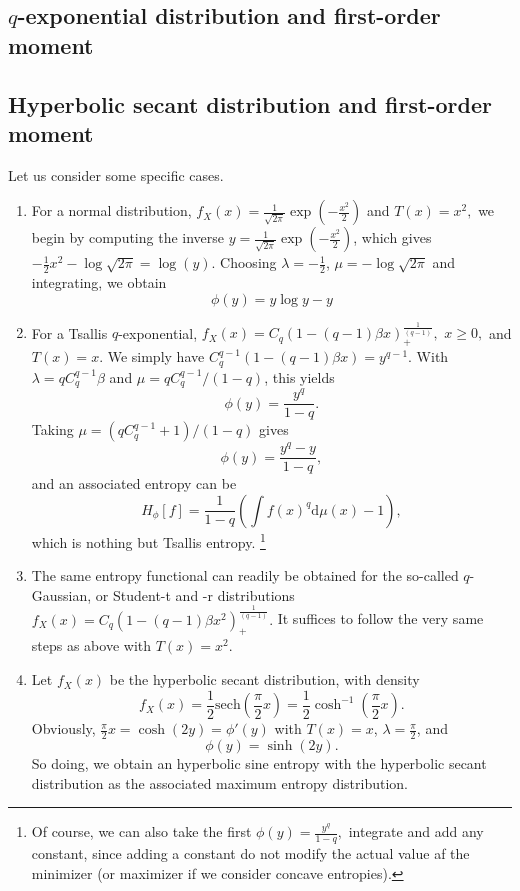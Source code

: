 \documentclass[english,onecolumn]{elsarticle}
\begin{document}
\subsection{$q$-exponential distribution and first-order moment}



\subsection{Hyperbolic secant distribution and first-order moment}


Let us consider some specific cases. 
\begin{enumerate}
\item For a normal distribution, $f_{X}(x)=\frac{1}{\sqrt{2\pi}}\exp(-\frac{x^{2}}{2})$
and $T(x)=x^{2},$ we begin by computing the inverse $y=\frac{1}{\sqrt{2\pi}}\exp(-\frac{x^{2}}{2})$,
which gives $-\frac{1}{2}x^{2}-\log\sqrt{2\pi}=\log(y).$ Choosing
$\lambda=-\frac{1}{2}$, $\mu=-\log\sqrt{2\pi}$ and integrating,
we obtain 
\[
\phi(y)=y\log y-y
\]

\item For a Tsallis $q$-exponential, $f_{X}(x)=C_{q}\left(1-(q-1)\beta x\right)_{+}^{\frac{1}{(q-1)}},$
$x\geq0,$ and $T(x)=x$. We simply have $C_{q}^{q-1}\left(1-(q-1)\beta x\right)=y^{q-1}$.
With $\lambda=qC_{q}^{q-1}\beta$ and $\mu=qC_{q}^{q-1}/(1-q)$, this
yields 
\[
\phi(y)=\frac{y^{q}}{1-q}.
\]
Taking $\mu=\left(qC_{q}^{q-1}+1\right)/(1-q)$ gives 
\[
\phi(y)=\frac{y^{q}-y}{1-q},
\]
and an associated entropy can be 
\[
H_{\phi}[f]=\frac{1}{1-q}\left(\int f(x)^{q}\text{d}\mu(x)-1\right),
\]
which is nothing but Tsallis entropy.%
\footnote{Of course, we can also take the first $\phi(y)=\frac{y^{q}}{1-q},$
integrate and add any constant, since adding a constant do not modify
the actual value af the minimizer (or maximizer if we consider concave
entropies). %
}
\item The same entropy functional can readily be obtained for the so-called
$q$-Gaussian, or Student-t and -r distributions $f_{X}(x)=C_{q}\left(1-(q-1)\beta x^{2}\right)_{+}^{\frac{1}{(q-1)}}.$
It suffices to follow the very same steps as above with $T(x)=x^{2}.$ 
\item Let $f_{X}(x)$ be the hyperbolic secant distribution, with density
\[
f_{X}(x)=\frac{1}{2}\text{sech}(\frac{\pi}{2}x)=\frac{1}{2}\cosh^{-1}(\frac{\pi}{2}x).
\]
Obviously, $\frac{\pi}{2}x=\cosh(2y)=\phi'(y)$ with $T(x)=x$, $\lambda=\frac{\pi}{2}$,
and 
\[
\phi(y)=\sinh(2y).
\]
So doing, we obtain an hyperbolic sine entropy with the hyperbolic
secant distribution as the associated maximum entropy distribution.
\end{enumerate}
\end{document}
